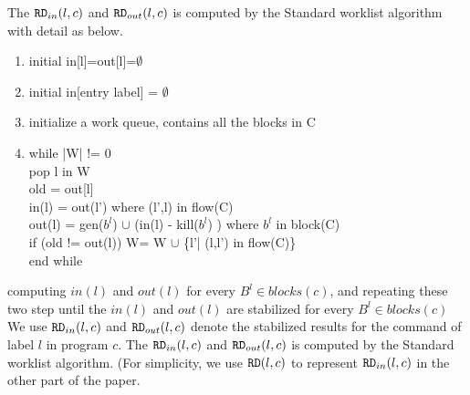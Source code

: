 The $\mathtt{RD}_{in}(l,c)$ and $\mathtt{RD}_{out}(l, c)$ is computed by the Standard worklist algorithm with detail as below.
\begin{enumerate}
    \item initial in[l]=out[l]=$\emptyset$
    \item initial in[entry label] = $\emptyset$
    \item initialize a work queue, contains all the blocks in C
    \item while |W| != 0 \\
         pop l in W\\
          old = out[l]\\
          in(l) =  out(l') where (l',l) in flow(C)\\
           out(l) = gen($b^l$) $\cup$ (in(l) - kill($b^l$) ) where $b^l$ in block(C)   \\
          if (old != out(l)) W= W $\cup$ \{l'| (l,l') in flow(C)\}\\
          end while
\end{enumerate}
%
computing $in(l)$ and $out(l)$ for every $B^l \in blocks(c) $, and repeating these two step
until the $in(l)$ and $out(l)$ are stabilized for every $B^l \in blocks(c) $
We use $\mathtt{RD}_{in}(l,c)$ and $\mathtt{RD}_{out}(l, c)$ denote the stabilized results for the command of label $l$ in program $c$. 
The $\mathtt{RD}_{in}(l,c)$ and $\mathtt{RD}_{out}(l, c)$ is computed by the Standard worklist algorithm. (For simplicity, we use $\mathtt{RD}(l,c)$ to represent $\mathtt{RD}_{in}(l,c)$ in the other part of the paper.
